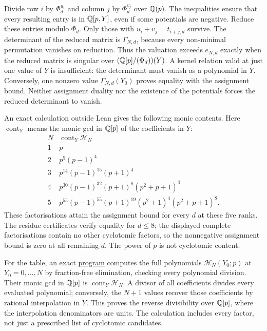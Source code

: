 \documentclass[11pt]{article}
\begin{document}
Divide row $i$ by $\Phi_d^{u_i}$ and column $j$ by $\Phi_d^{v_j}$
over $\mathbb{Q}(p)$. The inequalities ensure that every resulting entry is
in $\mathbb{Q}[p,Y]$, even if some potentials are negative. Reduce these
entries modulo $\Phi_d$. Only those with
$u_i+v_j=t_{i+j,d}$ survive. The determinant of the reduced matrix is
$\Gamma_{N,d}$, because every non-minimal permutation vanishes on
reduction. Thus the valuation exceeds $e_{N,d}$ exactly when the
reduced matrix is singular over $(\mathbb{Q}[p]/(\Phi_d))(Y)$.
A kernel relation valid at just one value of $Y$ is insufficient:
the determinant must vanish as a polynomial in $Y$. Conversely, one
nonzero value $\Gamma_{N,d}(Y_0)$ proves equality with the assignment
bound. Neither assignment duality nor the existence of the potentials
forces the reduced determinant to vanish.


An exact calculation outside Lean gives the following monic contents.
Here $\operatorname{cont}_Y$ means the monic gcd in $\mathbb{Q}[p]$ of the
coefficients in $Y$:
\[
\begin{array}{c|l}
N&\operatorname{cont}_Y\mathcal H_N\\\hline
1&p\\
2&p^5(p-1)^4\\
3&p^{14}(p-1)^{15}(p+1)^4\\
4&p^{30}(p-1)^{32}(p+1)^8(p^2+p+1)^4\\
5&p^{55}(p-1)^{55}(p+1)^{19}(p^2+1)^4(p^2+p+1)^8.
\end{array}
\]
These factorisations attain the assignment bound for every $d$ at
these five ranks. The residue certificates verify equality for
$d\le8$; the displayed complete factorisations contain no other
cyclotomic factors, so the nonnegative assignment bound is zero at
all remaining $d$. The power of $p$ is not cyclotomic content.

For the table, an exact
\href{https://github.com/wcook04/plectis-erdos/blob/4beca4ad0c00a626def9c73f2420e20ebf8d1968/research/experiments/erdos1049/cyclotomic_content.py}{program}
computes the full polynomials
$\mathcal H_N(Y_0;p)$ at $Y_0=0,\ldots,N$ by fraction-free
elimination, checking every polynomial division. Their monic gcd in $\mathbb{Q}[p]$ is $\operatorname{cont}_Y\mathcal H_N$.
A divisor of all coefficients divides every evaluated polynomial;
conversely, the $N+1$ values recover those coefficients by rational
interpolation in $Y$. This proves the reverse divisibility over
$\mathbb{Q}[p]$, where the interpolation denominators are units. The calculation includes every
factor, not just a prescribed list of cyclotomic candidates.
\end{document}
